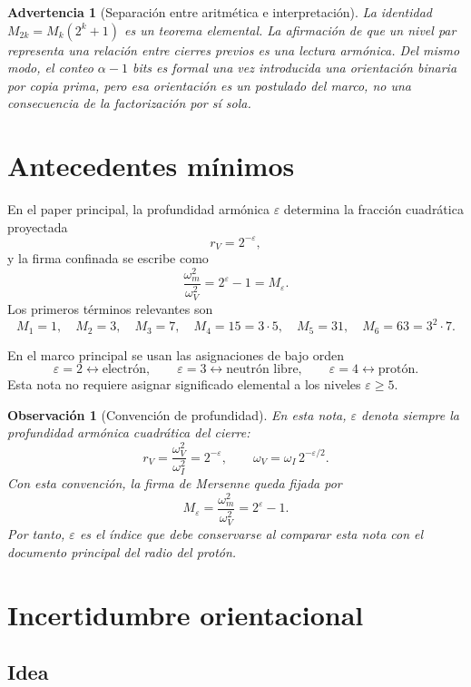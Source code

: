 \documentclass[11pt]{article}
\newtheorem{observacion}{Observación}
\newtheorem{advertencia}{Advertencia}
\begin{document}
\begin{advertencia}[Separación entre aritmética e interpretación]
La identidad $M_{2k}=M_k(2^k+1)$ es un teorema elemental. La afirmación de que un nivel par representa una relación entre cierres previos es una lectura armónica. Del mismo modo, el conteo $\alpha-1$ bits es formal una vez introducida una orientación binaria por copia prima, pero esa orientación es un postulado del marco, no una consecuencia de la factorización por sí sola.
\end{advertencia}

\clearpage
\section{Antecedentes mínimos}

En el paper principal, la profundidad armónica $\varepsilon$ determina la fracción cuadrática proyectada
\[
r_V=2^{-\varepsilon},
\]
y la firma confinada se escribe como
\[
\frac{\omega_m^2}{\omega_V^2}=2^\varepsilon-1=M_\varepsilon.
\]
Los primeros términos relevantes son
\[
M_1=1,\quad
M_2=3,\quad
M_3=7,\quad
M_4=15=3\cdot5,\quad
M_5=31,\quad
M_6=63=3^2\cdot7.
\]

En el marco principal se usan las asignaciones de bajo orden
\[
\varepsilon=2\leftrightarrow \text{electrón},\qquad
\varepsilon=3\leftrightarrow \text{neutrón libre},\qquad
\varepsilon=4\leftrightarrow \text{protón}.
\]
Esta nota no requiere asignar significado elemental a los niveles $\varepsilon\geq5$.

\begin{observacion}[Convención de profundidad]
En esta nota, $\varepsilon$ denota siempre la profundidad armónica cuadrática del cierre:
\[
r_V=\frac{\omega_V^2}{\omega_I^2}=2^{-\varepsilon},
\qquad
\omega_V=\omega_I\,2^{-\varepsilon/2}.
\]
Con esta convención, la firma de Mersenne queda fijada por
\[
M_\varepsilon=\frac{\omega_m^2}{\omega_V^2}=2^\varepsilon-1.
\]
Por tanto, $\varepsilon$ es el índice que debe conservarse al comparar esta nota con el documento principal del radio del protón.
\end{observacion}

\clearpage
\section{Incertidumbre orientacional}

\subsection{Idea}
\end{document}
